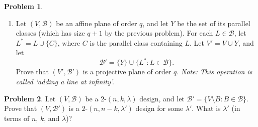 \documentclass[11pt, letter]{amsart}
\theoremstyle{definition}
\newtheorem{problem}{Problem}[]
\newcommand{\cB}{\ensuremath{\mathcal B}}
\begin{document}
\begin{problem}
\begin{enumerate}
  \item Let $(V, \cB)$ be an affine plane of order $q$, and let $Y$ be the set of its parallel classes (which has size $q + 1$ by the previous problem).  For each $L \in \cB$, let $L^* = L \cup \{C\}$, where $C$ is the parallel class containing $L$.  Let $V' = V \cup Y$, and let
    \begin{equation*}
      \cB' = \{Y\} \cup \{L^* : L \in \mathcal B\}.
    \end{equation*}
    Prove that $(V', \cB')$ is a projective plane of order $q$.  \textit{Note: This operation is called `adding a line at infinity'.}

    
  \end{enumerate}
\end{problem}
\clearpage

\begin{problem}
  Let $(V, \cB)$ be a $2$-$(n, k, \lambda)$ design, and let $\cB' = \{V \setminus B : B \in \cB\}$.  Prove that $(V, \cB')$ is a $2$-$(n, n - k, \lambda')$ design for some $\lambda'$.  What is $\lambda'$ (in terms of $n$, $k$, and $\lambda$)?
\end{problem}
\end{document}
